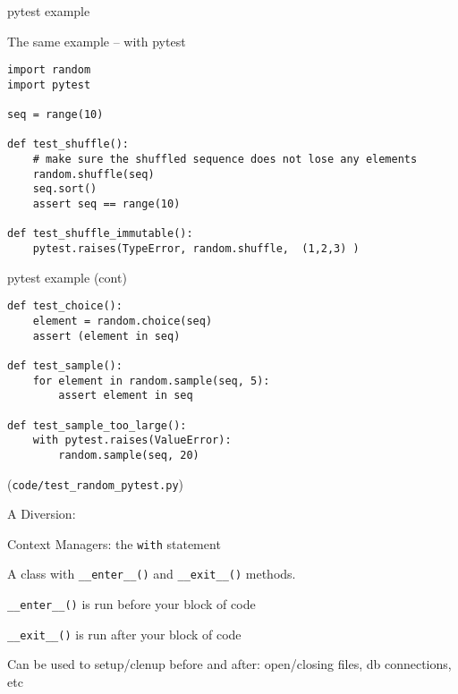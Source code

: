 \documentclass{beamer}
\begin{document}
\begin{frame}[fragile]{pytest example}

{\Large The same example -- with pytest}

{\small
\begin{verbatim}
import random
import pytest

seq = range(10)

def test_shuffle():
    # make sure the shuffled sequence does not lose any elements
    random.shuffle(seq)
    seq.sort()
    assert seq == range(10)

def test_shuffle_immutable():
    pytest.raises(TypeError, random.shuffle,  (1,2,3) )
\end{verbatim}
}

\end{frame} 

\begin{frame}[fragile]{pytest example (cont) }

{\small
\begin{verbatim}
def test_choice():
    element = random.choice(seq)
    assert (element in seq)

def test_sample():
    for element in random.sample(seq, 5):
        assert element in seq

def test_sample_too_large():
    with pytest.raises(ValueError):
        random.sample(seq, 20)
\end{verbatim}
}

\vfill
(\verb|code/test_random_pytest.py|)

\end{frame} 

\begin{frame}[fragile]{A Diversion:}

{\LARGE Context Managers:} {\Large the \verb|with| statement}

\vfill
{\Large A class with \verb|__enter__()| and \verb|__exit__()| methods.}
 
\vfill
{\Large \verb|__enter__()| is run before your block of code}

\vfill
{\Large \verb|__exit__()| is run after your block of code}

\vfill
{\Large Can be used to setup/clenup before and after: open/closing files, db connections, etc}
\end{frame} 
\end{document}
